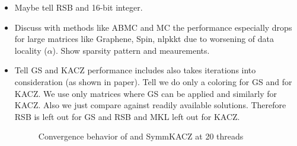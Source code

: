 \begin{itemize}
	\item Maybe tell RSB and 16-bit integer.
	\item Discuss with methods like ABMC and MC the performance especially drops for large matrices like Graphene, Spin, nlpkkt due to worsening of data locality ($\alpha$). Show sparsity pattern and \LIKWID meaurements. 
	\item Tell GS and KACZ performance includes also takes iterations into consideration (as shown in paper). Tell we do only a \DONE coloring for GS and \DTWO for KACZ. We use only matrices where GS can be applied and similarly for KACZ. Also we just compare against readily available solutions. Therefore RSB is left out for GS and RSB and MKL left out for KACZ.
	
\begin{figure}[thbp]
	\centering
	\caption{Convergence behavior of \SYMMGS and \acrshort{SymmKACZ} at 20 threads}
	\label{fig:conv_behavior}
\end{figure}
	

\end{itemize}
